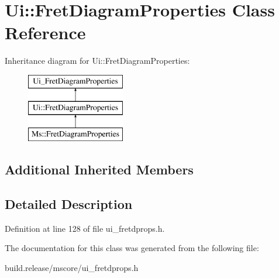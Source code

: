 \hypertarget{class_ui_1_1_fret_diagram_properties}{}\section{Ui\+:\+:Fret\+Diagram\+Properties Class Reference}
\label{class_ui_1_1_fret_diagram_properties}
Inheritance diagram for Ui\+:\+:Fret\+Diagram\+Properties\+:\begin{figure}[H]
\begin{center}
\leavevmode
\includegraphics[height=3.000000cm]{class_ui_1_1_fret_diagram_properties}
\end{center}
\end{figure}
\subsection*{Additional Inherited Members}


\subsection{Detailed Description}


Definition at line 128 of file ui\+\_\+fretdprops.\+h.



The documentation for this class was generated from the following file\+:\begin{DoxyCompactItemize}
\item 
build.\+release/mscore/ui\+\_\+fretdprops.\+h\end{DoxyCompactItemize}
